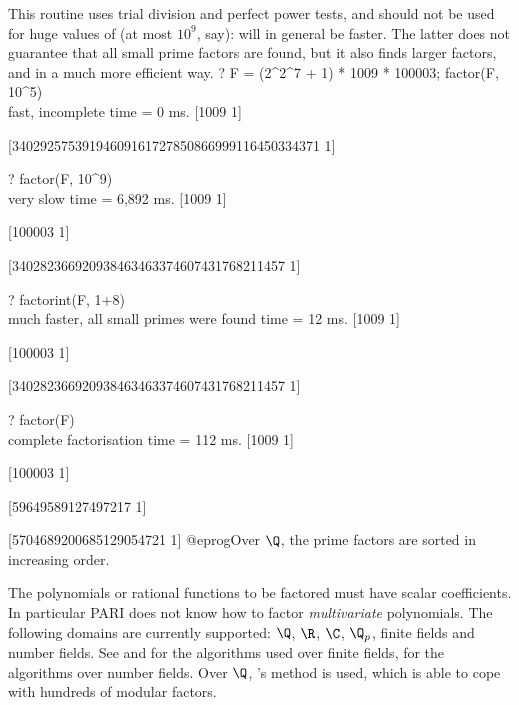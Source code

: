 This routine uses trial division and perfect power tests, and should not be
used for huge values of  (at most $10^9$, say):
 will in general be faster. The latter does not
guarantee that all small
prime factors are found, but it also finds larger factors, and in a much more
efficient way.
\bprog
? F = (2^2^7 + 1) * 1009 * 100003; factor(F, 10^5)  \\ fast, incomplete
time = 0 ms.
[1009 1]

[34029257539194609161727850866999116450334371 1]

? factor(F, 10^9)    \\ very slow
time = 6,892 ms.
[1009 1]

[100003 1]

[340282366920938463463374607431768211457 1]

? factorint(F, 1+8)  \\ much faster, all small primes were found
time = 12 ms.
[1009 1]

[100003 1]

[340282366920938463463374607431768211457 1]

? factor(F)   \\ complete factorisation
time = 112 ms.
[1009 1]

[100003 1]

[59649589127497217 1]

[5704689200685129054721 1]
@eprog\noindent Over $\Q$, the prime factors are sorted in increasing order.

The polynomials or rational functions to be factored must have scalar
coefficients. In particular PARI does not know how to factor
\emph{multivariate} polynomials. The following domains are currently
supported: $\Q$, $\R$, $\C$, $\Q_p$, finite fields and number fields.
See  and  for
the algorithms used over finite fields,  for the algorithms
over number fields. Over $\Q$, 's method is used, which is
able to cope with hundreds of modular factors.

